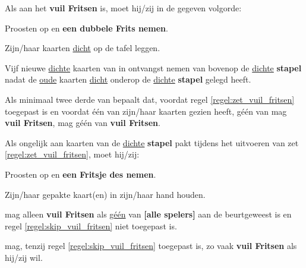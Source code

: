 \newpage
{}
\label{sec:vuil_fritsen}


\vervolgLijst{}
    \item Als \eenSpeler aan het \textbf{vuil Fritsen} is, moet hij/zij in de gegeven volgorde:
    \puntLijst{}
        \item Proosten op  en \textbf{een dubbele Frits nemen}\footnotemark[2].
        \item Zijn/haar kaarten \ul{dicht} op de tafel leggen.
        \item Vijf nieuwe \ul{dichte} kaarten van \Frits in ontvangst nemen van bovenop de \ul{dichte} \textbf{stapel} nadat \Frits de \ul{oude} kaarten \ul{dicht} onderop de \ul{dichte} \textbf{stapel} gelegd heeft.
    \eindPuntLijst{}
     \label{regel:zet_vuil_fritsen}
\eindLijst{}

\vervolgLijst{}
    \item Als minimaal twee derde van \alleSpelers bepaalt dat, voordat regel \ref{regel:zet_vuil_fritsen} toegepast is en voordat \'e\'en van \alleSpelers zijn/haar kaarten gezien heeft, géén van \alleSpelers mag \textbf{vuil Fritsen}, mag géén van \alleSpelers \textbf{vuil Fritsen}.
    \label{regel:skip_vuil_fritsen}
\eindLijst{}

\vervolgLijst{}
    \item Als \eenSpeler ongelijk aan \Frits kaarten van de \ul{dichte} \textbf{stapel} pakt tijdens het uitvoeren van zet \ref{regel:zet_vuil_fritsen}, moet hij/zij:
    \puntLijst{}
        \item Proosten op  en \textbf{een Fritsje des nemen}\footnotemark[3].
        \item Zijn/haar gepakte kaart(en) in zijn/haar hand houden.
    \eindPuntLijst{}
\eindLijst{}

\vervolgLijst{}
    \item \EenSpeler mag alleen \textbf{vuil Fritsen} als \ul{g\'e\'en} van \textbf{[alle spelers]} aan de beurt\footnotemark[1] geweest is en regel \ref{regel:skip_vuil_fritsen} niet toegepast is. 
\eindLijst{}

\vervolgLijst{}
    \item \EenSpeler mag, tenzij regel \ref{regel:skip_vuil_fritsen} toegepast is, zo vaak \textbf{vuil Fritsen} als hij/zij wil. 
\eindLijst{}

